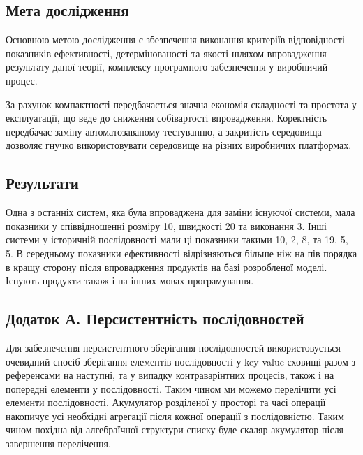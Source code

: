 \documentclass[11pt,oneside]{article}
\begin{document}
\newpage

\subsection{Мета дослідження}
\vspace{0.5cm}
   Основною метою дослідження є збезпечення виконання критеріїв відповідності
   показників ефективності, детермінованості та якості шляхом впровадження
   результату даної теорії, комплексу програмного забезпечення у виробничий процес.

   За рахунок компактності передбачається значна економія складності та простота у експлуатації,
   що веде до сниження собівартості впровадження. Коректність передбачає заміну
   автоматозаваному тестуванню, а закритість середовища дозволяє гнучко використовувати
   середовище на різних виробничих платформах.
   \\

\subsection{Результати}
\vspace{0.5cm}
   Одна з останніх систем, яка була впроваджена для заміни існуючої системи, мала
   показники у співвідношенні розміру 10, швидкості 20 та виконання 3. Інші системи
   у історичній послідовності мали ці показники такими 10, 2, 8, та 19, 5, 5.
   В середньому показники ефективності відрізняються більше ніж на пів порядка
   в кращу сторону після впровадження продуктів на базі розробленої моделі.
   Існують продукти також і на інших мовах програмування.

\newpage
\subsection{Додаток А. Персистентність послідовностей}

Для забезпечення персистентного зберігання послідовностей використовується
очевидний спосіб зберігання елементів послідовності у key-value сховищі разом
з референсами на наступні, та у випадку контраварінтних процесів, також і на
попередні елементи у послідовності. Таким чином ми можемо перелічити усі
елементи послідовності. Акумулятор розділеної у просторі та часі операції
накопичує усі необхідні агрегації після кожної операції з послідовністю. Таким
чином похідна від алгебраїчної структури списку буде скаляр-акумулятор після
завершення перелічення.
\end{document}
